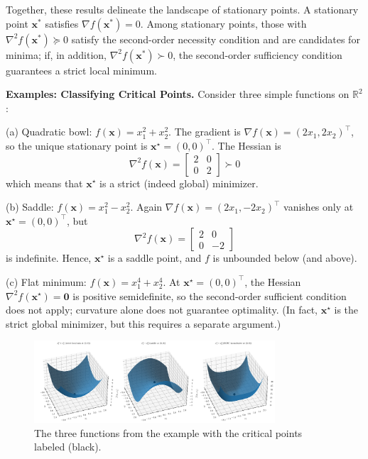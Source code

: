 Together, these results delineate the landscape of stationary points. A stationary point $\mathbf{x}^*$ satisfies $\nabla f(\mathbf{x}^*)=0$. Among stationary points, those with $\nabla^2 f(\mathbf{x}^*)\succeq 0$ satisfy the second-order necessity condition and are candidates for minima; if, in addition, $\nabla^2 f(\mathbf{x}^*)\succ 0$, the second-order sufficiency condition guarantees a strict local minimum.


\begin{exampleBox}
    \textbf{Examples: Classifying Critical Points.}
    Consider three simple functions on $\mathbb{R}^2$:
    
    (a) Quadratic bowl: $f(\mathbf{x})=x_1^2+x_2^2$. The gradient is $\nabla f(\mathbf{x})=(2x_1,2x_2)^\top$, so the unique stationary point is $\mathbf{x}^\star=(0,0)^\top$. The Hessian is
    \[
    \nabla^2 f(\mathbf{x})=\begin{bmatrix}2&0\\0&2\end{bmatrix}\succ 0
    \]
    which means that $\mathbf{x}^\star$ is a strict (indeed global) minimizer.
    
    (b) Saddle: $f(\mathbf{x})=x_1^2-x_2^2$. Again $\nabla f(\mathbf{x})=(2x_1,-2x_2)^\top$ vanishes only at $\mathbf{x}^\star=(0,0)^\top$, but
    \[
    \nabla^2 f(\mathbf{x})=\begin{bmatrix}2&0\\0&-2\end{bmatrix}
    \]
    is indefinite. Hence, $\mathbf{x}^\star$ is a saddle point, and $f$ is unbounded below (and above).
    
    (c) Flat minimum: $f(\mathbf{x})=x_1^4+x_2^4$. At $\mathbf{x}^\star=(0,0)^\top$, the Hessian $\nabla^2 f(\mathbf{x}^\star)=\mathbf{0}$ is positive semidefinite, so the second-order sufficient condition does not apply; curvature alone does not guarantee optimality. (In fact, $\mathbf{x}^\star$ is the strict global minimizer, but this requires a separate argument.)

    \begin{figure}[H]
        \centering
        \includegraphics[width=0.8\textwidth]{figs/optimization/critical_points.pdf}
        \caption{The three functions from the example with the critical points labeled (black).}
        \label{fig:optimality-conditions}
    \end{figure}
    \end{exampleBox}


